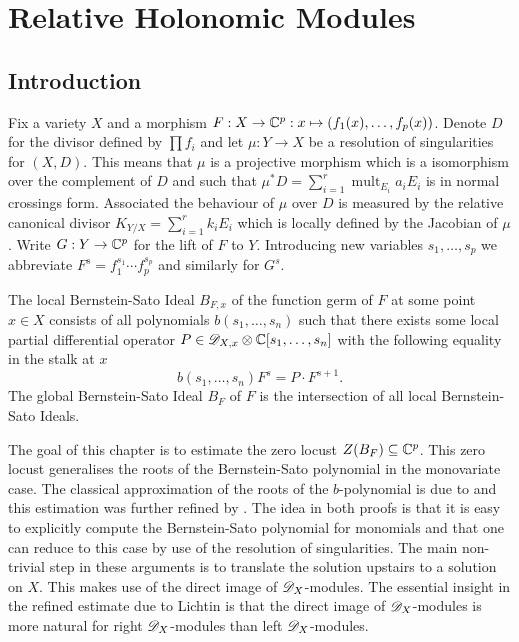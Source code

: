 \chapter{Relative Holonomic Modules}
\section{Introduction}\label{sec: IntoductionChapterRelative}
Fix a variety $X$ and a morphism $F:X\to \mathbb{C}^p: x \mapsto (f_1(x), \ldots, f_p(x))$. Denote $D$ for the divisor defined by $\prod f_i$ and let $\mu:Y\to X$ be a resolution of singularities for $(X,D)$.
This means that $\mu$ is a projective morphism which is a isomorphism over the complement of $D$ and such that $\mu^*D = \sum_{i=1}^r \operatorname{mult}_{E_i} a_i E_i$ is in normal crossings form.
Associated the behaviour of $\mu$ over $D$ is measured by the relative canonical divisor $K_{Y/X} = \sum_{i=1}^r k_i E_i$ which is locally defined by the Jacobian of $\mu$.
Write $G:Y\to \mathbb{C}^p$ for the lift of $F$ to $Y$.
Introducing new variables $s_1,\ldots,s_p$ we abbreviate $F^s= f_1^{s_1} \cdots f_p^{s_p}$ and similarly for $G^s$.


The local Bernstein-Sato Ideal $B_{F,x}$ of the function germ of $F$ at some point $x\in X$ consists of all polynomials $b(s_1,\ldots, s_n)$ such that there exists some local partial differential operator $P\in \mathscr{D}_{X,x}\otimes \mathbb{C}[s_1,\ldots,s_n]$ with the following equality in the stalk at $x$
$$b(s_1,\ldots, s_n) F^s = P\cdot F^{s+1}.$$
The global Bernstein-Sato Ideal $B_F$ of $F$ is the intersection of all local Bernstein-Sato Ideals.

The goal of this chapter is to estimate the zero locust $Z(B_{F})\subseteq \mathbb{C}^p$.
This zero locust generalises the roots of the Bernstein-Sato polynomial in the monovariate case.
The classical approximation of the roots of the $b$-polynomial is due to \cite{kashiwara1976b} and this estimation was further refined by \cite{lichtin1989poles}.
The idea in both proofs is that it is easy to explicitly compute the Bernstein-Sato polynomial for monomials and that one can reduce to this case by use of the resolution of singularities.
The main non-trivial step in these arguments is to translate the solution upstairs to a solution on $X$.
This makes use of the direct image of $\mathscr{D}_X$-modules.
The essential insight in the refined estimate due to Lichtin is that the direct image of $\mathscr{D}_X$-modules is more natural for right $\mathscr{D}_X$-modules than left $\mathscr{D}_X$-modules.


